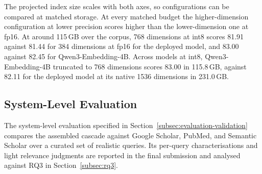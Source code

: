 The projected index size scales with both axes, so configurations can be compared at matched storage. At every matched budget the higher-dimension configuration at lower precision scores higher than the lower-dimension one at fp16. At around 115\,GB over the corpus, 768 dimensions at int8 scores 81.91 against 81.44 for 384 dimensions at fp16 for the deployed model, and 83.00 against 82.45 for Qwen3-Embedding-4B. Across models at int8, Qwen3-Embedding-4B truncated to 768 dimensions scores 83.00 in 115.8\,GB, against 82.11 for the deployed model at its native 1536 dimensions in 231.0\,GB.

\subsection{System-Level Evaluation}
\label{sec:results-system}
The system-level evaluation specified in Section~\ref{subsec:evaluation-validation} compares the assembled cascade against Google Scholar, PubMed, and Semantic Scholar over a curated set of realistic queries. Its per-query characterisations and light relevance judgments are reported in the final submission and analysed against RQ3 in Section~\ref{subsec:rq3}.